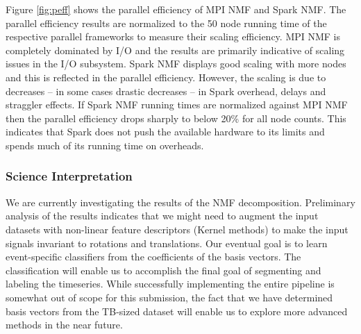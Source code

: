 Figure \ref{fig:peff} shows the parallel efficiency of MPI NMF and Spark NMF. The parallel efficiency results are normalized to the 50 node running time of the respective parallel frameworks to measure their scaling efficiency. MPI NMF is completely dominated by I/O and the results are primarily indicative of scaling issues in the I/O subsystem. Spark NMF displays good scaling with more nodes and this is reflected in the parallel efficiency. However, the scaling is due to decreases -- in some cases drastic decreases --  in Spark overhead, delays and straggler effects. If Spark NMF running times are normalized against MPI NMF then the parallel efficiency drops sharply to below 20\% for all node counts. This indicates that Spark does not push the available hardware to its limits and spends much of its running time on overheads.





\subsubsection{Science Interpretation}
We are currently investigating the results of the NMF decomposition. Preliminary analysis of the results indicates that we might need to augment the input datasets with non-linear feature descriptors (Kernel methods) to make the input signals invariant to rotations and translations. Our eventual goal is to learn event-specific classifiers from the coefficients of the basis vectors. The classification will enable us to accomplish the final goal of segmenting and labeling the timeseries. While successfully implementing the entire pipeline is somewhat out of scope for this submission, the fact that we have determined basis vectors from the TB-sized dataset will enable us to explore more advanced methods in the near future.

